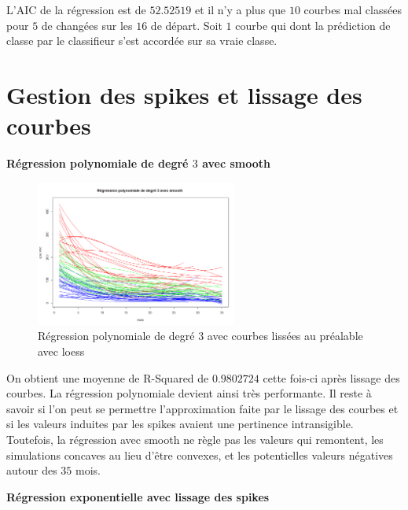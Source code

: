 \documentclass[12pt]{article}
\begin{document}
L'AIC de la r\'egression est de $52.52519$ et il n'y a plus que $10$ courbes mal class\'ees pour $5$ de chang\'ees sur les $16$ de d\'epart. Soit $1$ courbe qui dont la pr\'ediction de classe par le classifieur s'est accord\'ee sur sa vraie classe. 


\newpage

\section{Gestion des spikes et lissage des courbes}

\textbf{R\'egression polynomiale de degr\'e $3$ avec smooth}

\begin{figure}[H]
 \centering %
	\includegraphics[width=250px]{reg_pol3_smooth_loess}
  \caption{\label{fig:reg_pol3_smooth_loess} R\'egression polynomiale de degr\'e 3 avec courbes liss\'ees au pr\'ealable avec loess}
\end{figure}

On obtient une moyenne de R-Squared de $0.9802724$ cette fois-ci apr\`es lissage des courbes. La r\'egression polynomiale devient ainsi tr\`es performante. Il reste \`a savoir si l'on peut se permettre l'approximation faite par le lissage des courbes et si les valeurs induites par les spikes avaient une pertinence intransigible. 
\newline
Toutefois, la r\'egression avec smooth ne r\`egle pas les valeurs qui remontent, les simulations concaves au lieu d'\^etre convexes, et les potentielles valeurs n\'egatives autour des $35$ mois.

\textbf{R\'egression exponentielle avec lissage des spikes}
\end{document}
